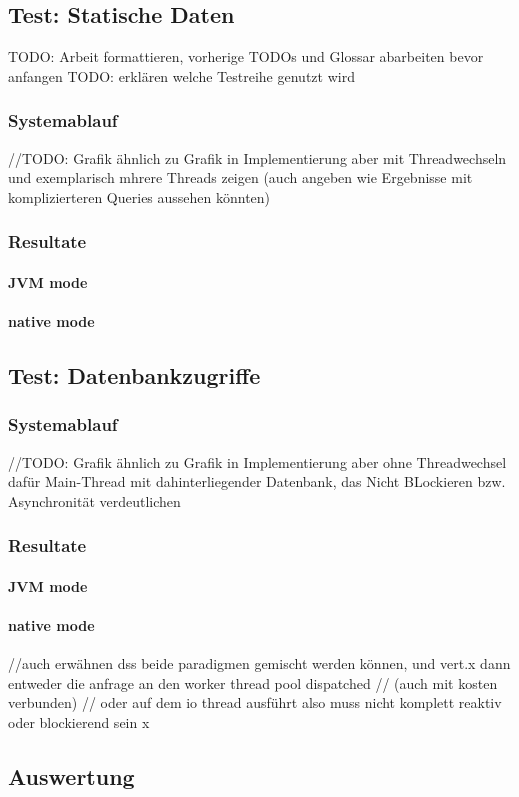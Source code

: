 \subsection{Test: Statische Daten}
\label{section:statische_daten}
TODO: Arbeit formattieren, vorherige TODOs und Glossar abarbeiten bevor anfangen
TODO: erklären welche Testreihe genutzt wird
\subsubsection{Systemablauf}
//TODO: Grafik ähnlich zu Grafik in Implementierung aber mit Threadwechseln und exemplarisch mhrere Threads zeigen
(auch angeben wie Ergebnisse mit komplizierteren Queries aussehen könnten)
\subsubsection{Resultate}
\paragraph{JVM mode}
\paragraph{native mode}

\subsection{Test: Datenbankzugriffe}
\label{section:datenbankzugriffe}

\subsubsection{Systemablauf}
//TODO: Grafik ähnlich zu Grafik in Implementierung aber ohne Threadwechsel dafür Main-Thread mit dahinterliegender Datenbank,
das Nicht BLockieren bzw. Asynchronität verdeutlichen

\subsubsection{Resultate}
\paragraph{JVM mode}
\paragraph{native mode}

//auch erwähnen dss beide paradigmen gemischt werden können, und vert.x dann entweder die anfrage an den worker thread pool dispatched
// (auch mit kosten verbunden)
// oder auf dem io thread ausführt also muss nicht komplett reaktiv oder blockierend sein x
\subsection{Auswertung}

\label{section:auswertung}